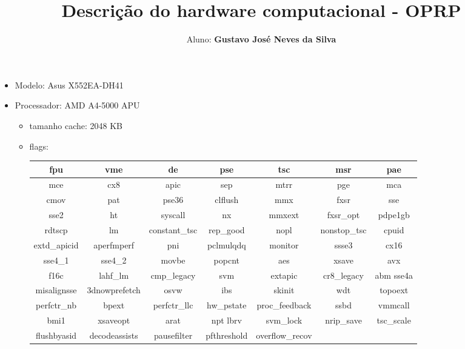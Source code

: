\documentclass[11pt]{article}
\title{Descrição do hardware computacional - OPRP}
\author{Aluno: \textbf{Gustavo José Neves da Silva}}
\begin{document}
    
    \date{}
    
    \maketitle
    
        \begin{itemize}
           \item Modelo: Asus X552EA-DH41
           \item Processador: AMD A4-5000 APU
           \begin{itemize}
            \item tamanho cache: 2048 KB
            \item flags:
            \begin{table}[h]
               \scriptsize
               \begin{tabular}{| c | c | c | c | c | c | c |}
                  \hline
                  fpu & vme & de & pse & tsc & msr & pae\\ \hline
                  mce & cx8 & apic & sep & mtrr & pge & mca\\ \hline
                  cmov & pat & pse36 & clflush & mmx & fxsr & sse\\ \hline
                  sse2 & ht & syscall & nx & mmxext & fxsr\_opt & pdpe1gb\\ \hline
                  rdtscp & lm & constant\_tsc & rep\_good & nopl & nonstop\_tsc & cpuid\\ \hline
                  extd\_apicid & aperfmperf & pni & pclmulqdq & monitor & ssse3 & cx16\\ \hline
                  sse4\_1 & sse4\_2 & movbe & popcnt & aes & xsave & avx\\ \hline
                  f16c & lahf\_lm & cmp\_legacy & svm & extapic & cr8\_legacy & abm sse4a\\ \hline
                  misalignsse & 3dnowprefetch & osvw & ibs & skinit & wdt & topoext\\ \hline
                  perfctr\_nb & bpext & perfctr\_llc & hw\_pstate & proc\_feedback & ssbd & vmmcall\\ \hline
                  bmi1 & xsaveopt & arat & npt lbrv & svm\_lock & nrip\_save & tsc\_scale\\ \hline
                  flushbyasid & decodeassists & pausefilter & pfthreshold & overflow\_recov & & \\ \hline         
               \end{tabular}

\end{table}
\end{itemize}
\end{itemize}
\end{document}
